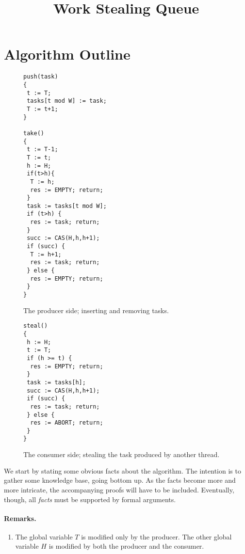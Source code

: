 \documentclass[a4paper]{article}
\title{Work Stealing Queue}
\begin{document}
\maketitle

\noindent 
\section{Algorithm Outline}

\begin{figure}[ht]
\begin{lstlisting}
push(task)
{
 t := T;
 tasks[t mod W] := task;
 T := t+1;
}

take()
{
 t := T-1;
 T := t;
 h := H;
 if(t>h){
  T := h; 
  res := EMPTY; return;
 }
 task := tasks[t mod W];
 if (t>h) {
  res := task; return;
 }
 succ := CAS(H,h,h+1);
 if (succ) {
  T := h+1;
  res := task; return;
 } else {
  res := EMPTY; return;
 }
}
\end{lstlisting} 
\caption{The producer side; inserting and removing tasks.}
\label{fig:producer}
\end{figure}

\begin{figure}[hbt]
\begin{lstlisting}
steal()
{
 h := H;
 t := T;
 if (h >= t) {
  res := EMPTY; return;
 }
 task := tasks[h];
 succ := CAS(H,h,h+1);
 if (succ) {
  res := task; return;
 } else {
  res := ABORT; return;
 }
}
\end{lstlisting}
\caption{The consumer side; stealing the task produced by another thread.}
\label{fig:consumer}
\end{figure}
We start by stating some obvious facts about the algorithm. 
The intention is to gather some knowledge base, going bottom up. 
As the facts become more and more intricate, the accompanying proofs will have to be included. 
Eventually, though, all {\em facts} must be supported by formal arguments.

\paragraph{Remarks.}
\begin{enumerate}[label=\bfseries Rem \arabic*:]
\item The global variable $T$ is modified only by the producer. 
The other global variable $H$ is modified by both the producer and the consumer.
\end{enumerate}
\end{document}
